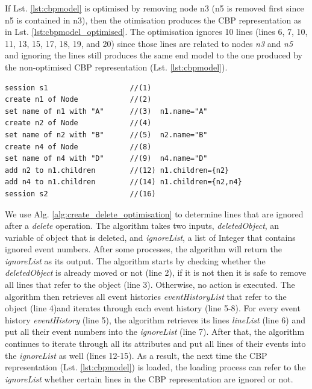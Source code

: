 \documentclass{llncs}
\begin{document}
If  Lst. \ref{lst:cbpmodel} is optimised by removing node n3 (n5 is removed first since n5 is contained in n3), then the otimisation produces the CBP representation as in Lst. \ref{lst:cbpmodel_optimised}. The optimisation ignores 10 lines (lines 6, 7, 10, 11, 13, 15, 17, 18, 19, and 20) since those lines are related to nodes \emph{n3} and \emph{n5} and ignoring the lines still produces the same end model to the one produced by the non-optimised CBP representation (Lst. \ref{lst:cbpmodel}). 

\begin{lstlisting}[style=eol,caption={Change-based representation of the model of Figure \ref{fig:initial_model} after removal of node \emph{n5}.},label=lst:cbpmodel_optimised]
session s1                   //(1)
create n1 of Node            //(2)
set name of n1 with "A"      //(3)  n1.name="A"
create n2 of Node            //(4)
set name of n2 with "B"      //(5)  n2.name="B"
create n4 of Node            //(8)
set name of n4 with "D"      //(9)  n4.name="D"
add n2 to n1.children        //(12) n1.children={n2}
add n4 to n1.children        //(14) n1.children={n2,n4}
session s2                   //(16)
\end{lstlisting}

We use Alg. \ref{alg:create_delete_optimisation} to determine lines that are ignored after a \emph{delete} operation. The algorithm takes two inputs, \emph{deletedObject}, an variable of object that is deleted, and \emph{ignoreList}, a list of Integer that contains ignored event numbers. After some processes, the algorithm will return the \emph{ignoreList} as its output. The algorithm starts by checking whether the \emph{deletedObject} is already moved or not (line 2), if it is not then it is safe to remove all lines that refer to the object (line 3). Otherwise, no action is executed. The algorithm then retrieves all event histories \emph{eventHistoryList} that refer to the object (line 4)and iterates through each event history (line 5-8). For every event history \emph{eventHistory} (line 5), the algorithm retrieves its lines \emph{lineList} (line 6) and put all their event numbers into the \emph{ignoreList} (line 7). After that, the algorithm continues to iterate through all its attributes and put all lines of their events into the \emph{ignoreList} as well (lines 12-15). As a result, the next time the CBP representation (Lst. \ref{lst:cbpmodel}) is loaded, the loading process can refer to the \emph{ignoreList} whether certain lines in the CBP representation are ignored or not.       
\end{document}
